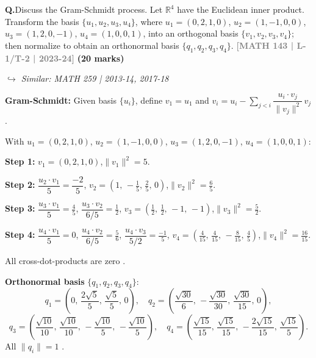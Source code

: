 \documentclass[12pt,a3paper]{article}
\newcommand{\yr}[1]{\hfill\textcolor{gray}{\small\textbf{[#1]}}}
\newcommand{\mk}[1]{\textcolor{orange!70!black}{\small\textbf{(#1 marks)}}}
\newcommand{\variant}[1]{\par\vspace{1pt}\textcolor{blue!50!black}%
  {\footnotesize\textit{$\hookrightarrow$ Similar: #1}}}
\newcounter{qnum}
\newcommand{\Q}[1]{%
  \needspace{4\baselineskip}
  \refstepcounter{qnum}
  \vspace{6pt}
  \noindent\textbf{Q\theqnum.}\enspace #1\par
}
\begin{document}
\Q{Discuss the Gram-Schmidt process. Let $\mathbb{R}^4$ have the Euclidean inner product. Transform the basis $\{u_1, u_2, u_3, u_4\}$, where $u_1 = (0,2,1,0)$, $u_2 = (1,-1,0,0)$, $u_3 = (1,2,0,-1)$, $u_4 = (1,0,0,1)$, into an orthogonal basis $\{v_1, v_2, v_3, v_4\}$; then normalize to obtain an orthonormal basis $\{q_1, q_2, q_3, q_4\}$.
\yr{MATH 143 | L-1/T-2 | 2023-24} \mk{20}
\variant{MATH 259 | 2013-14, 2017-18}}

\begin{tcolorbox}[enhanced,breakable,
  colback=cD!4,colframe=cD,boxrule=0.8pt,arc=5pt,
  title={\textbf{Answer --- Gram-Schmidt Process on $\mathbb{R}^4$ (Euclidean Inner Product)}},
  fonttitle=\bfseries\color{white},colbacktitle=cD]

\textbf{Gram-Schmidt:} Given basis $\{u_i\}$, define
$v_1=u_1$ and $v_i = u_i - \displaystyle\sum_{j<i}\dfrac{u_i\cdot v_j}{\|v_j\|^2}\,v_j$.

With $u_1=(0,2,1,0)$, $u_2=(1,-1,0,0)$, $u_3=(1,2,0,-1)$, $u_4=(1,0,0,1)$:

\medskip
\textbf{Step 1:} $v_1=(0,2,1,0)$,\quad $\|v_1\|^2=5$.

\textbf{Step 2:} $\dfrac{u_2\cdot v_1}{5}=\dfrac{-2}{5}$,\quad
$v_2=\left(1,\,-\tfrac{1}{5},\,\tfrac{2}{5},\,0\right)$,\quad $\|v_2\|^2=\tfrac{6}{5}$.

\textbf{Step 3:} $\dfrac{u_3\cdot v_1}{5}=\tfrac{4}{5}$,\; $\dfrac{u_3\cdot v_2}{6/5}=\tfrac{1}{2}$,\quad
$v_3=\left(\tfrac{1}{2},\,\tfrac{1}{2},\,-1,\,-1\right)$,\quad $\|v_3\|^2=\tfrac{5}{2}$.

\textbf{Step 4:} $\dfrac{u_4\cdot v_1}{5}=0$,\; $\dfrac{u_4\cdot v_2}{6/5}=\tfrac{5}{6}$,\;
$\dfrac{u_4\cdot v_3}{5/2}=\tfrac{-1}{5}$,\quad
$v_4=\left(\tfrac{4}{15},\,\tfrac{4}{15},\,-\tfrac{8}{15},\,\tfrac{4}{5}\right)$,\quad $\|v_4\|^2=\tfrac{16}{15}$.

All cross-dot-products are zero . \checkmark

\medskip
\textbf{Orthonormal basis} $\{q_1,q_2,q_3,q_4\}$:
\[
q_1 = \left(0,\,\frac{2\sqrt{5}}{5},\,\frac{\sqrt{5}}{5},\,0\right),\quad
q_2 = \left(\frac{\sqrt{30}}{6},\,-\frac{\sqrt{30}}{30},\,\frac{\sqrt{30}}{15},\,0\right),
\]
\[
q_3 = \left(\frac{\sqrt{10}}{10},\,\frac{\sqrt{10}}{10},\,-\frac{\sqrt{10}}{5},\,-\frac{\sqrt{10}}{5}\right),\quad
q_4 = \left(\frac{\sqrt{15}}{15},\,\frac{\sqrt{15}}{15},\,-\frac{2\sqrt{15}}{15},\,\frac{\sqrt{15}}{5}\right).
\]
All $\|q_i\|=1$ . \checkmark

\end{tcolorbox}
\end{document}
